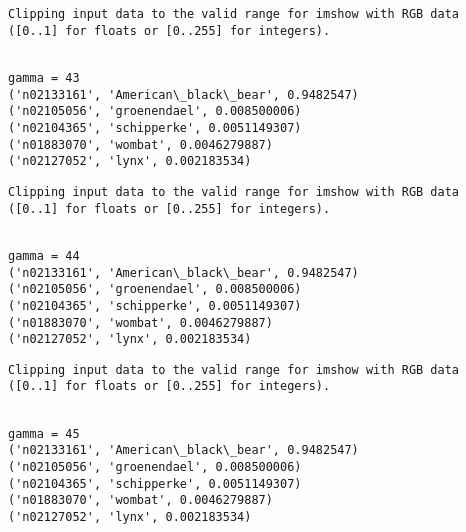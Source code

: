\documentclass[11pt]{article}
\begin{document}
    \begin{Verbatim}[commandchars=\\\{\}]
Clipping input data to the valid range for imshow with RGB data ([0..1] for floats or [0..255] for integers).

    \end{Verbatim}

    \begin{Verbatim}[commandchars=\\\{\}]

gamma = 43
('n02133161', 'American\_black\_bear', 0.9482547)
('n02105056', 'groenendael', 0.008500006)
('n02104365', 'schipperke', 0.0051149307)
('n01883070', 'wombat', 0.0046279887)
('n02127052', 'lynx', 0.002183534)

    \end{Verbatim}

    \begin{Verbatim}[commandchars=\\\{\}]
Clipping input data to the valid range for imshow with RGB data ([0..1] for floats or [0..255] for integers).

    \end{Verbatim}

    \begin{Verbatim}[commandchars=\\\{\}]

gamma = 44
('n02133161', 'American\_black\_bear', 0.9482547)
('n02105056', 'groenendael', 0.008500006)
('n02104365', 'schipperke', 0.0051149307)
('n01883070', 'wombat', 0.0046279887)
('n02127052', 'lynx', 0.002183534)

    \end{Verbatim}

    \begin{Verbatim}[commandchars=\\\{\}]
Clipping input data to the valid range for imshow with RGB data ([0..1] for floats or [0..255] for integers).

    \end{Verbatim}

    \begin{Verbatim}[commandchars=\\\{\}]

gamma = 45
('n02133161', 'American\_black\_bear', 0.9482547)
('n02105056', 'groenendael', 0.008500006)
('n02104365', 'schipperke', 0.0051149307)
('n01883070', 'wombat', 0.0046279887)
('n02127052', 'lynx', 0.002183534)

    \end{Verbatim}
\end{document}
